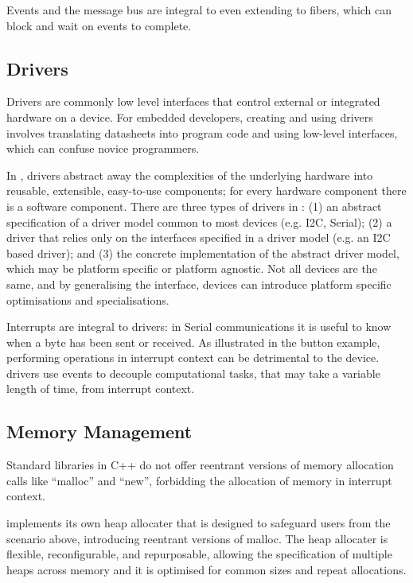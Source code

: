 Events and the message bus are integral to \CO even extending to fibers, which can block and wait on events to complete.

\subsection{Drivers}

Drivers are commonly low level interfaces that control external or integrated hardware on a device. For embedded developers, creating and using drivers involves translating datasheets into program code and using low-level interfaces, which can confuse novice programmers.

In \CON, drivers abstract away the complexities of the underlying hardware into reusable, extensible, easy-to-use components; for every hardware component there is a software component. There are three types of drivers in \CON: (1) an abstract specification of a driver model common to most devices (e.g. I2C, Serial); (2) a driver that relies only on the interfaces specified in a driver model  (e.g. an I2C based driver); and (3) the concrete implementation of the abstract driver model, which may be platform specific or platform agnostic. Not all devices are the same, and by generalising the interface, devices can introduce platform specific optimisations and specialisations.

Interrupts are integral to drivers: in Serial communications it is useful to know when a byte has been sent or received. As illustrated in the button example, performing operations in interrupt context can be detrimental to the device. \CO drivers use events to decouple computational tasks, that may take a variable length of time, from interrupt context.


\subsection{Memory Management}

Standard libraries in C++ do not offer reentrant versions of memory allocation calls like ``malloc'' and ``new'', forbidding the allocation of memory in interrupt context.

\CO implements its own heap allocater that is designed to safeguard users from the scenario above, introducing reentrant versions of malloc. The heap allocater is flexible, reconfigurable, and repurposable, allowing the specification of multiple heaps across memory and it is optimised for common sizes and repeat allocations.

